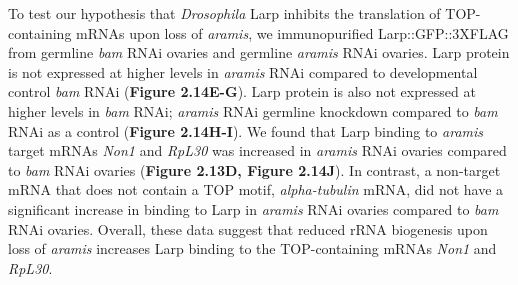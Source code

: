 \documentclass[12pt,oneside]{reedthesis}
\begin{document}
To test our hypothesis that \emph{Drosophila} Larp inhibits the translation of TOP-containing mRNAs upon loss of \emph{aramis}, we immunopurified Larp::GFP::3XFLAG from germline \emph{bam} RNAi ovaries and germline \emph{aramis} RNAi ovaries. Larp protein is not expressed at higher levels in \emph{aramis} RNAi compared to developmental control \emph{bam} RNAi (\textbf{Figure 2.14E-G}). Larp protein is also not expressed at higher levels in \emph{bam} RNAi; \emph{aramis} RNAi germline knockdown compared to \emph{bam} RNAi as a control (\textbf{Figure 2.14H-I}). We found that Larp binding to \emph{aramis} target mRNAs \emph{Non1} and \emph{RpL30} was increased in \emph{aramis} RNAi ovaries compared to \emph{bam} RNAi ovaries (\textbf{Figure 2.13D, Figure 2.14J}). In contrast, a non-target mRNA that does not contain a TOP motif, \emph{alpha-tubulin} mRNA, did not have a significant increase in binding to Larp in \emph{aramis} RNAi ovaries compared to \emph{bam} RNAi ovaries. Overall, these data suggest that reduced rRNA biogenesis upon loss of \emph{aramis} increases Larp binding to the TOP-containing mRNAs \emph{Non1} and \emph{RpL30}.
\end{document}
